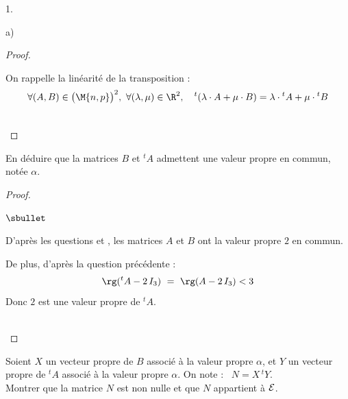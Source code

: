 \documentclass[11pt]{article}%
\begin{document}
\begin{noliste}{1.}
\begin{noliste}{a)}
\begin{proof}
      \begin{remark}
        On rappelle la linéarité de la transposition :
        \[
          \forall (A,B) \in \big( \M{n,p} \big)^2, \ \forall (\lambda, 
          \mu) \in \R^2, \quad {}^t(\lambda \cdot A + \mu \cdot B)
          = \lambda \cdot {}^t A + \mu \cdot {}^t B
        \]
      \end{remark}~\\[-1.4cm]
    \end{proof}
    
    
    \newpage

    
    \item En déduire que la matrices $B$ et ${}^t A$ admettent une 
    valeur propre en commun, notée $\alpha$.
    
    \begin{proof}~
      \begin{noliste}{$\sbullet$}
        \item D'après les questions  et , les 
	matrices $A$ et $B$ ont la valeur propre $2$ en commun.
        
        \item De plus, d'après la question précédente : 
        \[
          \rg({}^t A - 2 \, I_3) \ = \ \rg(A- 2 \, I_3) < 3
        \]
        Donc $2$ est une valeur propre de ${}^t A$.
      \end{noliste}
      ~\\[-1cm]
    \end{proof}
    
  \item Soient $X$ un vecteur propre de $B$ associé à la valeur propre
    $\alpha$, et $Y$ un vecteur propre de ${}^t A$ associé à la
    valeur propre $\alpha$. On note : \ $N=X \, {}^t Y$.\\
    Montrer que la matrice $N$ est non nulle et que $N$ appartient à
    ${\cal E}$.
    

\end{noliste}
\end{noliste}
\end{document}
